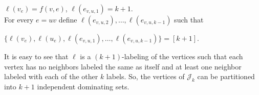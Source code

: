 \documentclass[
final
]{dmtcs-episciences}
\begin{document}
$\ell(v_{e})=f(v,e)$, $\ell(e_{v,u,1})=k+1$.
\\
For every $e=uv$ define $\ell(e_{v,u,2}), \ldots, \ell(e_{v,u,k-1})$ such that

$\{ \ell(v_{e}), \ell(u_{e}),\ell(e_{v,u,1}), \ldots, \ell(e_{v,u,k-1})\}=[k+1]$.

It is easy to see that $\ell$ is a $(k+1)$-labeling of the vertices such that each vertex has no neighbors labeled the same as itself and at least one neighbor labeled with each of the other $k$ labels. So, the vertices of $\mathcal{J}_k$ can be partitioned  into $k+1$ independent dominating sets. 



\end{document}
